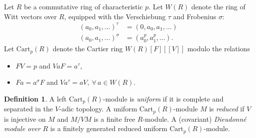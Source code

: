 \documentclass[]{amsart}
\theoremstyle{plain}
\theoremstyle{definition}
\newtheorem{defn}[thm]{Definition}
\theoremstyle{remark}
\newcommand{\<}{\langle}   %
\renewcommand{\>}{\rangle} %
\newcommand{\dieu}{Dieudonn\'{e} }
\begin{document}
\newcommand{\Cart}{{\mathrm{Cart}_p}}

Let $R$ be a commutative ring of characteristic $p$.
Let $W(R)$ denote the ring of
Witt vectors over $R$, equipped with the Verschiebung $\tau$ and
Frobenius $\sigma$:
\begin{equation*}
  \begin{split}
    (a_0,a_1,\dots)^\tau&=(0, a_0, a_1,\dots) \\
    (a_0,a_1,\dots)^\sigma&=(a_0^p, a_1^p,\dots).
  \end{split}
\end{equation*}
Let $\Cart(R)$ denote the Cartier ring $W(R)[F][\![V]\!]$ modulo the
relations
\begin{itemize}
\item[$\bullet$] $FV=p$ and $VaF=a^\tau$,
\item[$\bullet$] $Fa=a^\sigma F$ and $Va^\tau=aV, \ \forall\, a\in W(R).$
\end{itemize}

\begin{defn}
A left $\Cart(R)$-module is \emph{uniform} if it is complete and
  separated in the $V$-adic topology. A uniform $\Cart(R)$-module $M$ is
  \emph{reduced} if $V$ is injective on $M$ and $M/VM$ is a finite free
  $R$-module. A (covariant) \emph{\dieu module over $R$} is a finitely generated
  reduced uniform $\Cart(R)$-module.
\end{defn}

  
\end{document}
